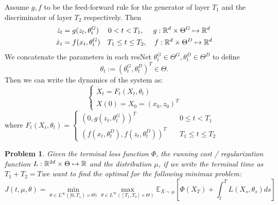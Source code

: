 Assume $g, f$ to be the feed-forward rule for the generator of layer $T_1$ and the discriminator of layer $T_2$ respectively. Then $$\begin{aligned}\dot z_t &= g(z_t, \theta_t^G) \quad \; 0<t<T_1, \quad  \; g: \mathbb{R}^d \times \Theta^G \mapsto \mathbb{R}^d \\
\dot x_t &= f(x_t, \theta_t^G) \quad T_1 \leq t\leq T_2, \quad f: \mathbb{R}^d \times \Theta^D \mapsto \mathbb{R}^d\end{aligned}$$
We concatenate the parameters in each resNet $\theta_t^G \in \Theta^G, \theta_t^D \in \Theta^D$ to define $$\theta_t := (\theta_t^G, \theta_t^D)^T \in \Theta .$$Then we can write the dynamics of the system as: $$
\begin{cases}
\dot X_t = F_t(X_t,\theta_t)\\
X(0)=X_0 = (x_0,z_0)^T
\end{cases} $$
$\text{where } F_t(X_t,\theta_t) = \begin{cases}
\left(0,g(z_t,\theta_t^G)\right)^T\quad & 0 \leq t < T_1\\
\left(f(x_t,\theta_t^D),f(z_t,\theta_t^D)\right)^T \quad & T_1 \leq t\leq T_2
\end{cases}$\\
\newline
\newtheorem*{GANP}{Problem}
\begin{GANP}
Given the terminal loss function $\Phi$, the running cost / regularization function $L: \mathbb{R}^{2d} \times \Theta \mapsto \mathbb{R}$ and the distribution $\mu$, if we write the terminal time as $T_1 +T_2 = T$we want to find the optimal for the following minimax problem:
$$J(t,\mu,\theta) = \min _{\theta \in L^{\infty}([0,T_1) \times \Theta)}\max _{\theta \in L^{\infty}([T_1,T_2] \times \Theta)} \mathbb{E}_{X \sim \mu} \left[ \Phi(X_{T}) + \int_{t}^{T}L(X_s, \theta_s) ds \right]$$
\end{GANP}
